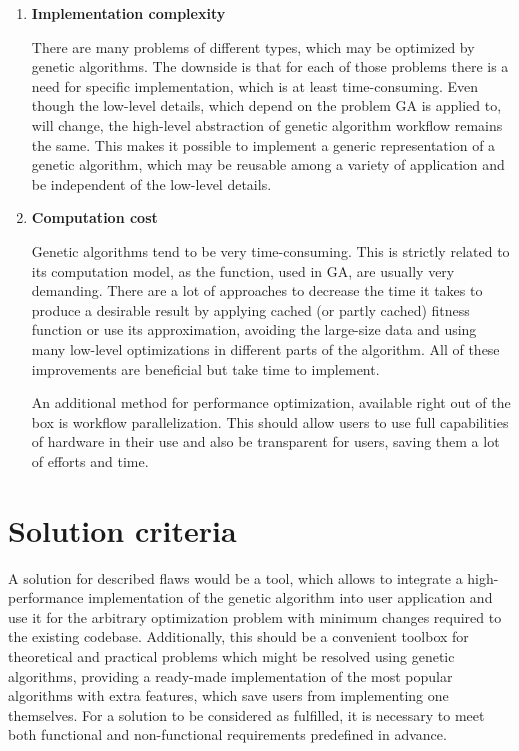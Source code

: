 \begin{enumerate}
\item \textbf{Implementation complexity}

There are many problems of different types, which may be optimized by genetic algorithms. The downside is that for each of those problems there is a need for specific implementation, which is at least time-consuming. Even though the low-level details, which depend on the problem GA is applied to, will change, the high-level abstraction of genetic algorithm workflow remains the same. This makes it possible to implement a generic representation of a genetic algorithm, which may be reusable among a variety of application and be independent of the low-level details. 
\medbreak

\item \textbf{Computation cost}

Genetic algorithms tend to be very time-consuming. This is strictly related to its computation model, as the function, used in GA, are usually very demanding. There are a lot of approaches to decrease the time it takes to produce a desirable result by applying cached (or partly cached) fitness function or use its approximation, avoiding the large-size data and using many low-level optimizations in different parts of the algorithm. All of these improvements are beneficial but take time to implement.

An additional method for performance optimization, available right out of the box is workflow parallelization. This should allow users to use full capabilities of hardware in their use and also be transparent for users, saving them a lot of efforts and time.
\medbreak

\end{enumerate}

\section{Solution criteria}

A solution for described flaws would be a tool, which allows to integrate a high-performance implementation of the genetic algorithm into user application and use it for the arbitrary optimization problem with minimum changes required to the existing codebase. Additionally, this should be a convenient toolbox for theoretical and practical problems which might be resolved using genetic algorithms, providing a ready-made implementation of the most popular algorithms with extra features, which save users from implementing one themselves. For a solution to be considered as fulfilled, it is necessary to meet both functional and non-functional requirements predefined in advance.

